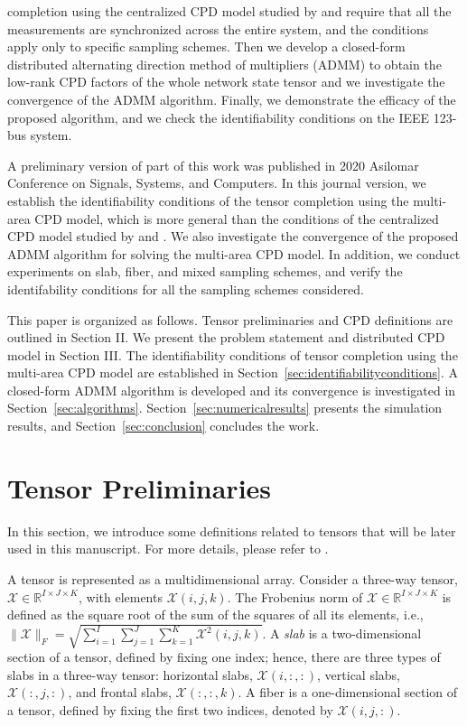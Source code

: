 \documentclass[journal]{IEEEtran}
\newcounter{propose}
\newcounter{thm}
\newcounter{define}
\newcommand{\Ten}[1]{\mathcal{#1}}
\begin{document}
completion using the centralized CPD model  studied by \cite{Kanatsoulis2020} and \cite{Zamzam2020}  require that all the measurements are synchronized across the entire system, and  the conditions 
 apply only to specific sampling schemes.  
Then we develop a  closed-form  distributed alternating  direction method of multipliers (ADMM) to obtain the low-rank CPD factors of the whole network state tensor and we investigate the convergence of the ADMM algorithm.  Finally, we demonstrate the efficacy of the proposed algorithm, and we check the identifiability conditions on the IEEE 123-bus system.

A preliminary version of part of this work was published in 2020 Asilomar Conference 
on Signals, Systems, and Computers\cite{Liu2020Asilomar}. In this journal version, we establish  the identifiability conditions of the tensor completion using the multi-area CPD model, which is more general than the conditions of the centralized CPD model studied by \cite{Kanatsoulis2020} and \cite{Zamzam2020}. We also investigate the convergence of the proposed ADMM algorithm for solving the multi-area CPD model. In addition, we conduct experiments on slab, fiber, and mixed sampling schemes, and verify the identifability conditions for all the sampling schemes considered. 
\fi


This paper is organized as follows.
Tensor preliminaries and CPD definitions are outlined in Section II. We present the problem statement and distributed CPD model in Section III. The identifiability conditions  of  tensor completion using the multi-area CPD model  are established in Section~\ref{sec:identifiabilityconditions}.
A closed-form ADMM algorithm  is developed and its convergence is investigated in Section~\ref{sec:algorithms}. Section~\ref{sec:numericalresults} presents the simulation results, and Section~\ref{sec:conclusion} concludes the work.
\section{Tensor Preliminaries}
\label{sec:tensorpreliminaries}
In this section, we introduce some definitions related to tensors that will be later used in this manuscript. For more details, please refer to \cite{Kolda2009, Sidiropoulos2017}.

A tensor is represented as a multidimensional array. 
Consider a three-way tensor, $\Ten{X}\in\mathbb{R}^{I\times J\times K}$, with elements $\Ten{X}(i,j,k)$. The Frobenius norm of $\Ten{X}\in\mathbb{R}^{I\times J\times K}$ is defined as the square root of the sum of the
squares of all its elements, i.e., $\|\Ten{X}\|_F=\sqrt{\sum_{i=1}^I\sum_{j=1}^J\sum_{k=1}^K\Ten{X}^2(i,j,k)}$. A \emph{slab}  is a two-dimensional section of a tensor, defined by fixing one index; hence, there are three types of slabs in a three-way tensor: horizontal slabs,  $\Ten{X}(i,:,:)$,  vertical slabs, $\Ten{X}(:,j,:)$, and frontal slabs, $\Ten{X}(:,:,k)$. A fiber is a one-dimensional section of a tensor, defined by fixing the first two indices, denoted by $\Ten{X}(i,j,:)$. 
\end{document}
